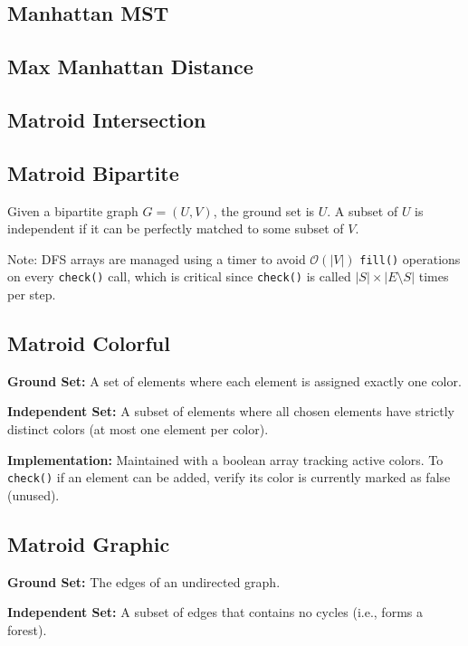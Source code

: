 \subsection{Manhattan MST}

\subsection{Max Manhattan Distance}
\subsection{Matroid Intersection}

\subsection{Matroid Bipartite}
Given a bipartite graph $G=(U,V)$, the ground set is $U$. A subset of $U$ is independent if it can be perfectly matched to some subset of $V$.

Note: DFS arrays are managed using a timer to avoid $\mathcal{O}(|V|)$ \texttt{fill()} operations on every \texttt{check()} call, which is critical since \texttt{check()} is called $|S| \times |E \setminus S|$ times per step.

\subsection{Matroid Colorful}
\textbf{Ground Set:} A set of elements where each element is assigned exactly one color.

\textbf{Independent Set:} A subset of elements where all chosen elements have strictly distinct colors (at most one element per color).

\textbf{Implementation:} Maintained with a boolean array tracking active colors. To \texttt{check()} if an element can be added, verify its color is currently marked as false (unused).

\subsection{Matroid Graphic}
\textbf{Ground Set:} The edges of an undirected graph.

\textbf{Independent Set:} A subset of edges that contains no cycles (i.e., forms a forest).

